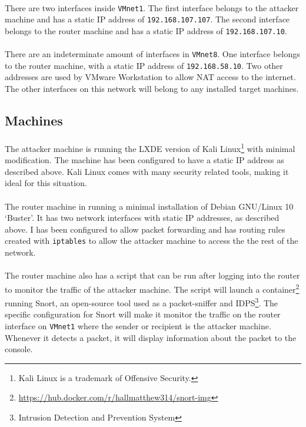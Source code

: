 \documentclass{article}
\begin{document}
\paragraph{}
There are two interfaces inside \texttt{VMnet1}.
The first interface belongs to the attacker machine and has a static IP address of \texttt{192.168.107.107}.
The second interface belongs to the router machine and has a static IP address of \texttt{192.168.107.10}.

\paragraph{}
There are an indeterminate amount of interfaces in \texttt{VMnet8}.
One interface belongs to the router machine, with a static IP address of \texttt{192.168.58.10}.
Two other addresses are used by VMware Workstation to allow NAT access to the internet.
The other interfaces on this network will belong to any installed target machines.

\subsection{Machines}

\paragraph{}
The attacker machine is running the LXDE version of Kali Linux\texttrademark \footnote{Kali Linux is a trademark of Offensive Security.} with minimal modification.
The machine has been configured to have a static IP address as described above.
Kali Linux comes with many security related tools, making it ideal for this situation.

\paragraph{}
The router machine in running a minimal installation of Debian GNU/Linux 10 `Buster'.
It has two network interfaces with static IP addresses, as described above.
I has been configured to allow packet forwarding and has routing rules created with \texttt{iptables} to allow the attacker machine to access the the rest of the network.

\paragraph{}
The router machine also has a script that can be run after logging into the router to monitor the traffic of the attacker machine.
The script will launch a container\footnote{\url{https://hub.docker.com/r/hallmatthew314/snort-img}} running Snort, an open-source tool used as a packet-sniffer and IDPS\footnote{Intrusion Detection and Prevention System}.
The specific configuration for Snort will make it monitor the traffic on the router interface on \texttt{VMnet1} where the sender or recipient is the attacker machine.
Whenever it detects a packet, it will display information about the packet to the console.
\end{document}
